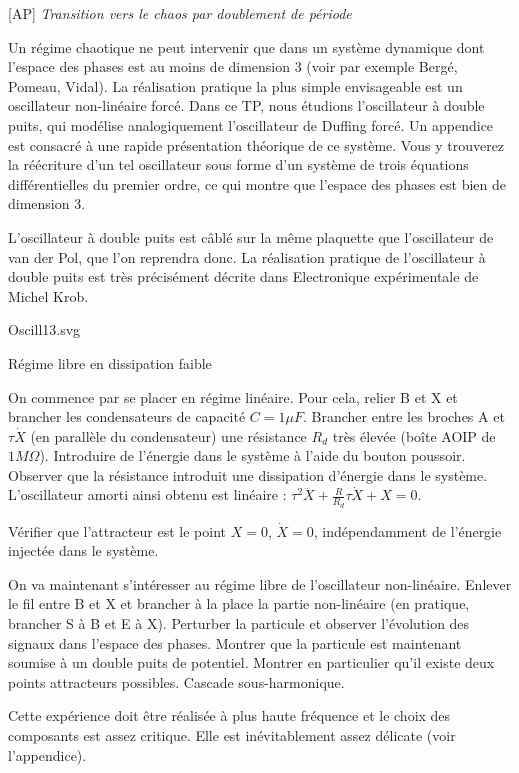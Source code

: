 \documentclass{article}%
\begin{document}
[AP] \textit{Transition vers le chaos par doublement de période}

Un régime chaotique ne peut intervenir que dans un système dynamique dont l'espace des phases est au moins de dimension 3 (voir par exemple Bergé, Pomeau, Vidal). La réalisation pratique la plus simple envisageable est un oscillateur non-linéaire forcé. Dans ce TP, nous étudions l'oscillateur à double puits, qui modélise analogiquement l'oscillateur de Duffing forcé. Un appendice est consacré à une rapide présentation théorique de ce système. Vous y trouverez la réécriture d'un tel oscillateur sous forme d'un système de trois équations différentielles du premier ordre, ce qui montre que l'espace des phases est bien de dimension 3.

L'oscillateur à double puits est câblé sur la même plaquette que l'oscillateur de van der Pol, que l'on reprendra donc. La réalisation pratique de l'oscillateur à double puits est très précisément décrite dans Electronique expérimentale de Michel Krob.

Oscill13.svg

Régime libre en dissipation faible

On commence par se placer en régime linéaire. Pour cela, relier B et X et brancher les condensateurs de capacité $C=1 \mu F$. Brancher entre les broches A et $\tau \dot X$ (en parallèle du condensateur) une résistance $R_d$ très élevée (boîte AOIP de $1 M\Omega$). Introduire de l'énergie dans le système à l'aide du bouton poussoir. Observer que la résistance introduit une dissipation d'énergie dans le système. L'oscillateur amorti ainsi obtenu est linéaire :
$ \tau^2 \ddot X+\frac{R}{R_d} \tau \dot X+X=0$.

Vérifier que l'attracteur est le point $X = 0$, $\dot X = 0$, indépendamment de l'énergie injectée dans le système.

On va maintenant s'intéresser au régime libre de l'oscillateur non-linéaire. Enlever le fil entre B et X et brancher à la place la partie non-linéaire (en pratique, brancher S à B et E à X). Perturber la particule et observer l'évolution des signaux dans l'espace des phases. Montrer que la particule est maintenant soumise à un double puits de potentiel. Montrer en particulier qu'il existe deux points attracteurs possibles.
Cascade sous-harmonique.

Cette expérience doit être réalisée à plus haute fréquence et le choix des composants est assez critique. Elle est inévitablement assez délicate (voir l'appendice).
\end{document}
